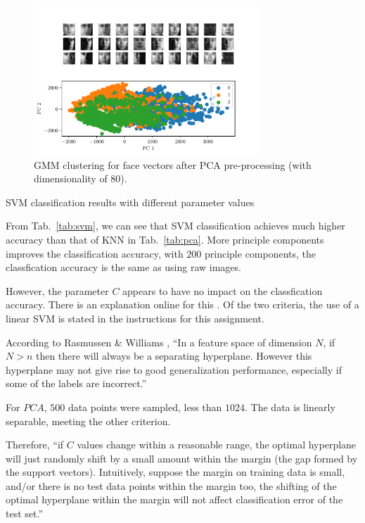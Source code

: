 \documentclass[a4paper]{exam}
\begin{document}
\begin{questions}
    \begin{figure}[h]
        \centering
        \includegraphics[width=0.75\textwidth]{gmm_80}
        \caption{GMM clustering for face vectors after PCA pre-processing (with dimensionality of 80).}
        \label{fig:gmm_80}
    \end{figure}
    \clearpage\question SVM classification results with different parameter values

    From Tab.~\ref{tab:svm}, we can see that SVM classification achieves much higher accuracy than that of KNN in Tab.~\ref{tab:pca}.
    More principle components improves the classification accuracy, with $200$ principle components, the classfication accuracy is the same as using raw images.

    However, the parameter $C$ appears to have no impact on the classfication accuracy.
    There is an explanation online for this \cite{238209}.
    Of the two criteria, the use of a linear SVM is stated in the instructions for this assignment.

    According to Rasmussen \& Williams \cite{10.5555/1162254}, ``In a feature space of dimension $N$, if $N>n$ then there will always be a separating hyperplane.
    However this hyperplane may not give rise to good generalization performance, especially if some of the labels are incorrect.''

    For $PCA$, $500$ data points were sampled, less than $1024$. The data is linearly separable, meeting the other criterion.

    Therefore, ``if $C$ values change within a reasonable range, the optimal hyperplane will just randomly shift by a small amount within the margin (the gap formed by the support vectors).
    Intuitively, suppose the margin on training data is small, and/or there is no test data points within the margin too, the shifting of the optimal hyperplane within the margin will not affect classification error of the test set.''


\end{questions}
\end{document}
